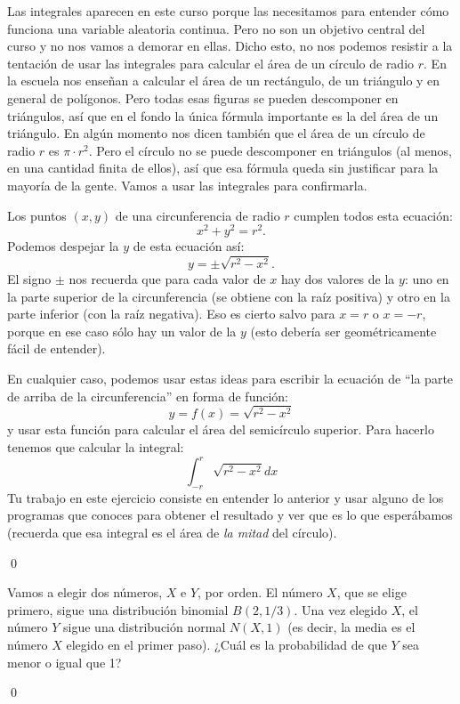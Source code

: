 \documentclass[10pt,a4paper]{article}\usepackage[]{graphicx}\usepackage[]{color}
\newcounter{cont01}
\begin{document}
\begin{ejercicio}
\label{tut05:ejercicio50}
Las integrales aparecen en este curso porque las necesitamos para entender cómo funciona una variable aleatoria continua. Pero no son un objetivo central del curso y no nos vamos a demorar en ellas. Dicho esto, no nos podemos resistir a la tentación de usar las integrales para calcular el área de un círculo de radio $r$. En la escuela nos enseñan a calcular el área de un rectángulo, de un triángulo y en general de polígonos. Pero todas esas figuras se pueden descomponer en triángulos, así que en el fondo la única fórmula importante es la del área de un triángulo. En algún momento nos dicen también que el área de un círculo de radio $r$ es $\pi\cdot r^2$. Pero el círculo no se puede descomponer en triángulos (al menos, en una cantidad finita de ellos), así que esa fórmula queda sin justificar para la mayoría de la gente. Vamos a usar las integrales para confirmarla.

Los puntos $(x,y)$ de una circunferencia de radio $r$ cumplen todos esta ecuación:
        \[x^2 + y^2 = r^2.\]
Podemos despejar la $y$ de esta ecuación así:
        \[
        y = \pm \sqrt{r^2 - x^2}.
        \]
El signo $\pm$ nos recuerda que para cada valor de $x$ hay dos valores de la $y$: uno en la parte superior de la circunferencia (se obtiene con la raíz positiva) y otro en la parte inferior (con la raíz negativa). Eso es cierto salvo para $x=r$ o $x=-r$, porque en ese caso sólo hay un valor de la $y$ (esto debería ser geométricamente fácil de entender).

En cualquier caso, podemos usar estas ideas para escribir la ecuación de ``la parte de arriba de la circunferencia'' en forma de función:
        \[y = f(x) = \sqrt{r^2 - x^2}\]
y usar esta función para calcular el área del semicírculo superior. Para hacerlo tenemos que calcular la integral:
        \[\int_{-r}^r\sqrt{r^2 - x^2}dx\]
Tu trabajo en este ejercicio consiste en entender lo anterior y usar alguno de los programas que conoces para obtener el resultado y ver que es lo que esperábamos (recuerda que esa integral es el área de {\em la mitad} del círculo).

\qed\end{ejercicio}
\begin{ejercicio}
\label{tut05:ejercicio51}
{Vamos a elegir dos números, $X$ e $Y$, por orden. El número $X$, que se elige primero, sigue 			una distribución binomial $B(2,1/3)$. Una vez elegido $X$, el número $Y$ sigue una distribución 			normal $N(X,1)$ (es decir, la media es el número $X$ elegido en el primer paso). ¿Cuál es la 				probabilidad de que $Y$ sea menor o igual que 1?}

\qed\end{ejercicio}
\end{document}
